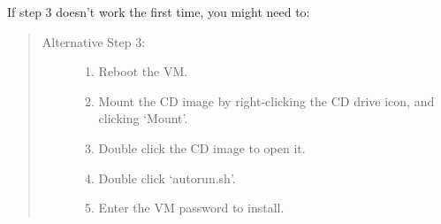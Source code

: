\documentclass[letterpaper,10pt,english]{sphinxmanual}
\begin{document}
If step 3 doesn't work the first time, you might need to:
\begin{quote}
\begin{description}
\item[{Alternative Step 3:}] \leavevmode\begin{enumerate}
\item {} 
Reboot the VM.

\item {} 
Mount the CD image by right-clicking the CD drive icon, and clicking
`Mount'.

\item {} 
Double click the CD image to open it.

\item {} 
Double click `autorun.sh'.

\item {} 
Enter the VM password to install.

\end{enumerate}

\end{description}
\end{quote}
\end{document}

